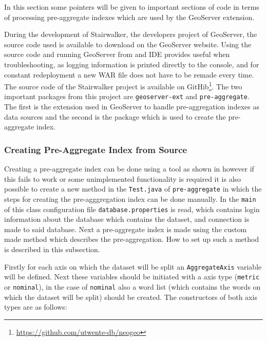 In this section some pointers will be given to important sections of code in terms of processing pre-aggregate indexes which are used by the GeoServer extension.

During the development of Stairwalker, the developers project of GeoServer, the source code used is available to download on the GeoServer website. Using the source code and running GeoServer from and IDE provides useful when troubleshooting, as logging information is printed directly to the console, and for constant redeployment a new WAR file does not have to be remade every time. The source code of the Stairwalker project is available on GitHib\footnote{\url{https://github.com/utwente-db/neogeo}}. The two important packages from this project are \lstinline|geoserver-ext| and \lstinline|pre-aggregate|. The first is the extension used in GeoServer to handle pre-aggregation indexes as data sources and the second is the package which is used to create the pre-aggregate index.

\subsubsection{Creating Pre-Aggregate Index from Source}
Creating a pre-aggregate index can be done using a tool as shown in  however if this fails to work or some unimplemented functionality is required it is also possible to create a new method in the \lstinline|Test.java| of \lstinline|pre-aggregate| in which the steps for creating the pre-agggregation index can be done manually. In the \lstinline|main| of this class configuration file \lstinline|database.properties| is read, which contains login information about the database which contains the dataset, and connection is made to said database. Next a pre-aggregate index is made using the custom made method which describes the pre-aggregation. How to set up such a method is described in this subsection.

Firstly for each axis on which the dataset will be split an \lstinline|AggregateAxis| variable will be defined. Next these variables should be initiated with a axis type (\lstinline|metric| or \lstinline|nominal|), in the case of \lstinline|nominal| also a word list (which contains the words on which the dataset will be split) should be created. The constructors of both axis types are as follows:

